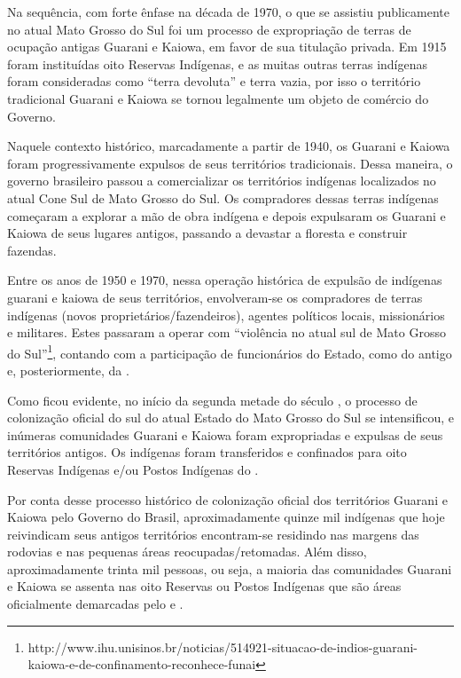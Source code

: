 Na sequência, com forte ênfase na década de 1970, o que se assistiu
publicamente no atual Mato Grosso do Sul foi um processo de
expropriação de terras de ocupação antigas Guarani e Kaiowa, em favor
de sua titulação privada. Em 1915 foram instituídas oito Reservas
Indígenas, e as muitas outras terras indígenas foram consideradas como
``terra devoluta'' e terra vazia, por isso o território tradicional
Guarani e Kaiowa se tornou legalmente um objeto de comércio do Governo.


Naquele contexto histórico, marcadamente a partir de 1940, os Guarani e
Kaiowa foram progressivamente expulsos de seus territórios
tradicionais. Dessa maneira, o governo brasileiro passou a
comercializar os territórios indígenas localizados no atual Cone Sul de
Mato Grosso do Sul. Os compradores dessas terras indígenas começaram a
explorar a mão de obra indígena e depois expulsaram os Guarani e Kaiowa
de seus lugares antigos, passando a devastar a floresta e construir
fazendas.

Entre os anos de 1950 e 1970, nessa operação histórica de expulsão de
indígenas guarani e kaiowa de seus territórios, envolveram-se os
compradores de terras indígenas (novos proprietários/fazendeiros),
agentes políticos locais, missionários e militares. Estes passaram a
operar com ``violência no atual sul de Mato Grosso do Sul''\footnote{http://www.ihu.unisinos.br/noticias/514921-situacao-de-indios-guarani-kaiowa-e-de-confinamento-reconhece-funai}, contando com a
participação de funcionários do Estado, como do antigo  e,
posteriormente, da . 

Como ficou evidente, no início da segunda metade do século , o
processo de colonização oficial do sul do atual Estado do Mato Grosso
do Sul se intensificou, e inúmeras comunidades Guarani e Kaiowa foram
expropriadas e expulsas de seus territórios antigos. Os indígenas foram
transferidos e confinados para oito Reservas Indígenas e/ou Postos
Indígenas do . 

Por conta desse processo histórico de colonização oficial dos
territórios Guarani e Kaiowa pelo Governo do Brasil, aproximadamente
quinze mil indígenas que hoje reivindicam seus antigos territórios
encontram-se residindo nas margens das rodovias e nas pequenas áreas
reocupadas/retomadas. Além disso, aproximadamente trinta mil pessoas,
ou seja, a maioria das comunidades Guarani e Kaiowa se assenta nas oito
Reservas ou Postos Indígenas que são áreas oficialmente demarcadas pelo
 e . 

